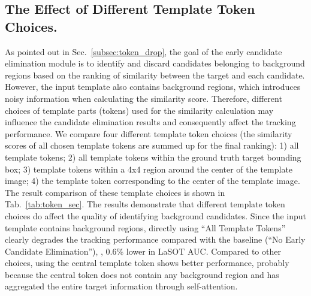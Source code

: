 \subsection{The Effect of Different Template Token Choices.}
As pointed out in Sec.~\ref{subsec:token_drop}, the goal of the early candidate elimination module is to identify and discard candidates belonging to background regions based on the ranking of similarity between the target and each candidate. However, the input template also contains background regions, which introduces noisy information when calculating the similarity score. Therefore,  different choices of template parts (tokens) used for the similarity calculation may influence the candidate elimination results and consequently affect the tracking performance. We compare four different template token choices (the similarity scores of all chosen template tokens are summed up for the final ranking): 1) all template tokens; 2) all template tokens within the ground truth target bounding box; 3) template tokens within a 4x4 region around the center of the template image; 4) the template token corresponding to the center of the template image. The result comparison of these template choices is shown in Tab.~\ref{tab:token_sec}. The results demonstrate that different template token choices do affect the quality of identifying background candidates. Since the input template contains background regions, directly using ``All Template Tokens'' clearly degrades the tracking performance compared with the baseline (``No Early Candidate Elimination''), \ie, 0.6\% lower in LaSOT AUC. Compared to other choices, using the central template token shows better performance, probably because the central token does not contain any background region and has aggregated the entire target information through self-attention.


